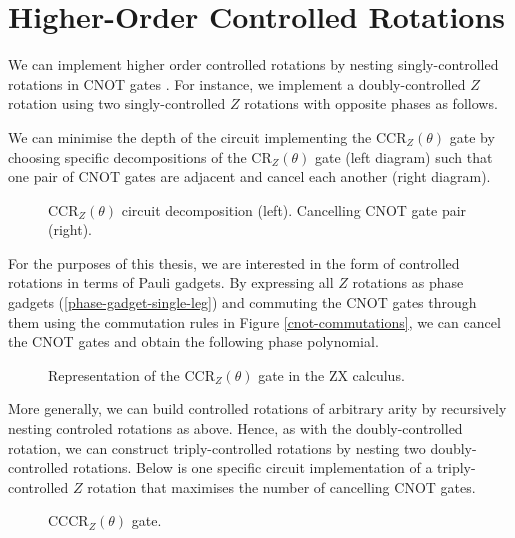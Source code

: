 \section{Higher-Order Controlled Rotations}

We can implement higher order controlled rotations by nesting singly-controlled rotations in CNOT gates \cite{Yordanov2020}. For instance, we implement a doubly-controlled $Z$ rotation using two singly-controlled $Z$ rotations with opposite phases as follows.


We can minimise the depth of the circuit implementing the CCR$_Z(\theta)$ gate by choosing specific decompositions of the CR$_Z(\theta)$ gate (left diagram) such that one pair of CNOT gates are adjacent and cancel each another (right diagram).

\begin{figure}[H]
    \centering
    \caption{CCR$_Z(\theta)$ circuit decomposition (left). Cancelling CNOT gate pair (right).}
\end{figure}

For the purposes of this thesis, we are interested in the form of controlled rotations in terms of Pauli gadgets. By expressing all $Z$ rotations as phase gadgets (\ref{phase-gadget-single-leg}) and commuting the CNOT gates through them using the commutation rules in Figure \ref{cnot-commutations}, we can cancel the CNOT gates and obtain the following phase polynomial.

\begin{figure}[H]
    \centering
    \caption{Representation of the CCR$_Z(\theta)$ gate in the ZX calculus.}
    \label{ccrz}
\end{figure}

More generally, we can build controlled rotations of arbitrary arity by recursively nesting controled rotations as above. Hence, as with the doubly-controlled rotation, we can construct triply-controlled rotations by nesting two doubly-controlled rotations. Below is one specific circuit implementation of a triply-controlled $Z$ rotation that maximises the number of cancelling CNOT gates.

\begin{figure}[H]
    \centering
    \caption{CCCR$_Z(\theta)$ gate.}
\end{figure}

